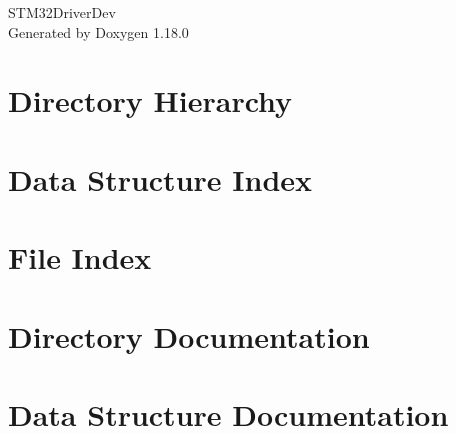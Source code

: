 \documentclass[twoside]{book}
\newcommand{\+}{\discretionary{\mbox{\scriptsize$\hookleftarrow$}}{}{}}
\newcommand{\clearemptydoublepage}{%
    \newpage{\pagestyle{empty}\cleardoublepage}%
  }
\begin{document}
  \raggedbottom
    \hypersetup{pageanchor=false,
                bookmarksnumbered=true,
                pdfencoding=unicode
               }
  \begin{titlepage}
  \vspace*{7cm}
  \begin{center}%
  {\Large STM32\+Driver\+Dev}\\
  \vspace*{1cm}
  {\large Generated by Doxygen 1.18.0}\\
  \end{center}
  \end{titlepage}
  \clearemptydoublepage
  \tableofcontents
  \clearemptydoublepage
  \hypersetup{pageanchor=true}
\chapter{Directory Hierarchy}

\chapter{Data Structure Index}

\chapter{File Index}

\chapter{Directory Documentation}













\chapter{Data Structure Documentation}













\end{document}
